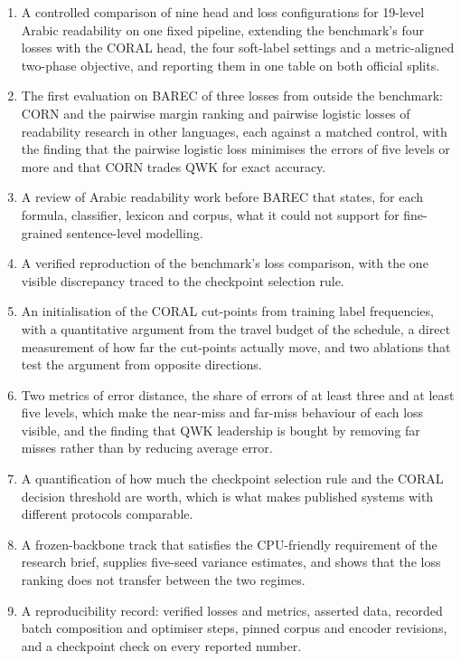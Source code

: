 \begin{enumerate}
\item A controlled comparison of nine head and loss configurations for 19-level Arabic
readability on one fixed pipeline, extending the benchmark's four losses with the CORAL head,
the four soft-label settings and a metric-aligned two-phase objective, and reporting them in one
table on both official splits.
\item The first evaluation on BAREC of three losses from outside the benchmark: CORN and the
pairwise margin ranking and pairwise logistic losses of readability research in other languages,
each against a matched control, with the finding that the pairwise logistic loss minimises the
errors of five levels or more and that CORN trades QWK for exact accuracy.
\item A review of Arabic readability work before BAREC that states, for each formula, classifier,
lexicon and corpus, what it could not support for fine-grained sentence-level modelling.
\item A verified reproduction of the benchmark's loss comparison, with the one visible
discrepancy traced to the checkpoint selection rule.
\item An initialisation of the CORAL cut-points from training label frequencies, with a
quantitative argument from the travel budget of the schedule, a direct measurement of how far
the cut-points actually move, and two ablations that test the argument from opposite directions.
\item Two metrics of error distance, the share of errors of at least three and at least five
levels, which make the near-miss and far-miss behaviour of each loss visible, and the finding
that QWK leadership is bought by removing far misses rather than by reducing average error.
\item A quantification of how much the checkpoint selection rule and the CORAL decision
threshold are worth, which is what makes published systems with different protocols comparable.
\item A frozen-backbone track that satisfies the CPU-friendly requirement of the research
brief, supplies five-seed variance estimates, and shows that the loss ranking does not transfer
between the two regimes.
\item A reproducibility record: verified losses and metrics, asserted data, recorded batch
composition and optimiser steps, pinned corpus and encoder revisions, and a checkpoint check on
every reported number.
\end{enumerate}

